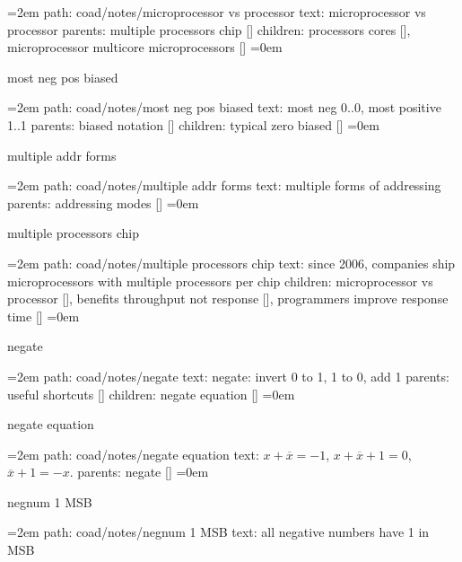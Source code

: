 \smallskip
\par\begingroup
\leftskip=2em
path: coad/notes/microprocessor vs processor
\smallskip
text:  microprocessor vs processor
\smallskip
parents:  multiple processors chip []
\smallskip
children: processors cores [], microprocessor multicore microprocessors []
\smallskip
\leftskip=0em
\par\endgroup
\bigskip
{}
most neg pos biased
\smallskip
\par\begingroup
\leftskip=2em
path: coad/notes/most neg pos biased
\smallskip
text:  most neg 0..0, most positive 1..1
\smallskip
parents:  biased notation []
\smallskip
children: typical zero biased []
\smallskip
\leftskip=0em
\par\endgroup
\bigskip
{}
multiple addr forms
\smallskip
\par\begingroup
\leftskip=2em
path: coad/notes/multiple addr forms
\smallskip
text:  multiple forms of addressing
\smallskip
parents:  addressing modes []
\smallskip
\leftskip=0em
\par\endgroup
\bigskip
{}
multiple processors chip
\smallskip
\par\begingroup
\leftskip=2em
path: coad/notes/multiple processors chip
\smallskip
text:  since 2006, companies ship microprocessors with multiple processors per chip
\smallskip
children: microprocessor vs processor [], benefits throughput not response [], programmers improve response time []
\smallskip
\leftskip=0em
\par\endgroup
\bigskip
{}
negate
\smallskip
\par\begingroup
\leftskip=2em
path: coad/notes/negate
\smallskip
text:  negate: invert 0 to 1, 1 to 0, add 1
\smallskip
parents:  useful shortcuts []
\smallskip
children: negate equation []
\smallskip
\leftskip=0em
\par\endgroup
\bigskip
{}
negate equation
\smallskip
\par\begingroup
\leftskip=2em
path: coad/notes/negate equation
\smallskip
text:  $x + \overline{x} = -1$, $x + \overline{x} + 1 = 0$, $\overline{x} + 1 = -x$.
\smallskip
parents:  negate []
\smallskip
\leftskip=0em
\par\endgroup
\bigskip
{}
negnum 1 MSB
\smallskip
\par\begingroup
\leftskip=2em
path: coad/notes/negnum 1 MSB
\smallskip
text:  all negative numbers have 1 in MSB
\smallskip
